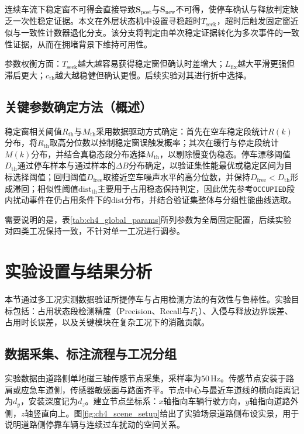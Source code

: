连续车流下稳定窗不可得会直接导致$\mathbf{S}_{\mathrm{post}}$与$\mathbf{S}_{\mathrm{new}}$不可得，使停车确认与释放判定缺乏一次性稳定证据。本文在外层状态机中设置寻稳超时$T_{\mathrm{seek}}$，超时后触发固定窗近似与一致性计数器退化分支。该分支将判定由单次稳定证据转化为多次事件的一致性证据，从而在拥堵背景下维持可用性。

参数权衡方面：$T_{\mathrm{seek}}$越大越容易获得稳定窗但确认时差增大；$L_{\mathrm{fix}}$越大平滑更强但滞后更大；$c_{\mathrm{th}}$越大越稳健但确认更慢。后续实验对其进行折中选择。

\subsection{关键参数确定方法（概述）}
\label{subsec:ch4_paramset}

稳定窗相关阈值$R_{\mathrm{th}}$与$M_{\mathrm{th}}$采用数据驱动方式确定：首先在空车稳定段统计$R(k)$分布，将$R_{\mathrm{th}}$取高分位数以控制稳定窗误触发概率；其次在缓行与停走段统计$M(k)$分布，并结合真稳态段分布选择$M_{\mathrm{th}}$，以剔除慢变伪稳态。停车漂移阈值$D_{\mathrm{th}}$通过停车样本与通过样本的$\Delta B$分布确定，以验证集性能最优或稳定区间为目标选择阈值；回归阈值$D_{\mathrm{free}}$取接近空车噪声水平的高分位数，并保持$D_{\mathrm{free}}<D_{\mathrm{th}}$形成滞回；相似性阈值$\mathrm{dist}_{\mathrm{th}}$主要用于占用稳态保持判定，因此优先参考\texttt{OCCUPIED}段内扰动事件在仍占用条件下的$\mathrm{dist}$分布，并结合验证集整体与分组性能曲线选取。

需要说明的是，表\ref{tab:ch4_global_params}所列参数为全局固定配置，后续实验对四类工况保持一致，不针对单一工况进行调参。

\section{实验设置与结果分析}
\label{sec:ch4_exp}

本节通过多工况实测数据验证所提停车与占用检测方法的有效性与鲁棒性。实验目标包括：占用状态段检测精度（Precision、Recall与$F_1$）、入侵与释放边界误差、占用时长误差，以及关键模块在复杂工况下的消融贡献。

\subsection{数据采集、标注流程与工况分组}
\label{subsec:ch4_data}

实验数据由道路侧单地磁三轴传感节点采集，采样率为$50\,\mathrm{Hz}$。传感节点安装于路肩或应急车道侧，传感器敏感面与路面齐平。节点中心与最近车道线的横向距离记为$d_y$，安装深度记为$d_z$。建立节点坐标系：$x$轴指向车辆行驶方向，$y$轴指向道路外侧，$z$轴竖直向上。图\ref{fig:ch4_scene_setup}给出了实验场景道路侧布设实景，用于说明道路侧停靠车辆与连续过车扰动的空间关系。


